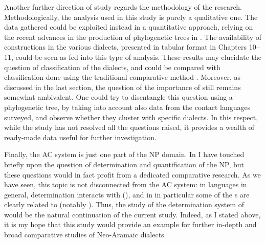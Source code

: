 Another further direction of study regards the methodology of the research.
Methodologically, the analysis used in this study is purely a qualitative one. The data gathered could be exploited instead  in a quantitative approach, relying on the recent advances in the production of phylogenetic trees in . The availability of constructions in the various dialects, presented in tabular format in Chapters 10--11, could be seen as  fed into this type of analysis. These results may elucidate the question of classification of the  dialects, and could be compared with classification done using the traditional comparative method \citep[e.g.][]{Hoberman1988history,MutzafiTransZab}. Moreover, as discussed in the last section, the question of the importance of  still remains somewhat ambivalent. One could try to disentangle this question using a phylogenetic tree, by taking into account also data from the contact languages surveyed, and observe whether they cluster with specific  dialects. In this respect, while the study has not resolved all the questions raised, it provides a wealth of ready-made data useful for further investigation. 

Finally, the AC system is just one part of the NP domain. In  I have touched briefly upon the question of determination and quantification of the  NP,  but these questions would in fact profit from a dedicated comparative research. As we have seen, this topic is not disconnected from the AC system: in  languages in general, determination interacts with  (), and in  in particular some of the \lnk*s are clearly related to  (notably \JUrm {}). Thus, the study of the determination system of  would be the natural continuation of the current study. Indeed, as I stated above, it is my hope that this study would provide an example for further in-depth and broad comparative studies of Neo-Aramaic dialects. 







